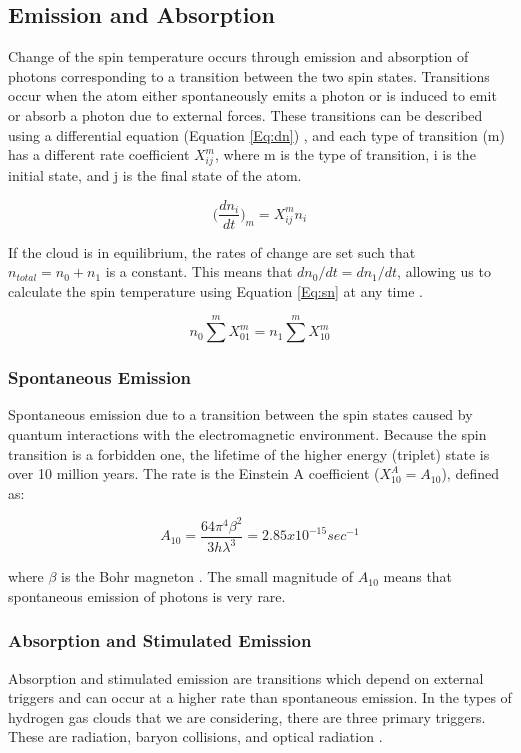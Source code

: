 \subsection{Emission and Absorption} \label{Sec:dT_S}
Change of the spin temperature occurs through emission and absorption of \cm photons corresponding to a transition between the two spin states. Transitions occur when the atom either spontaneously emits a photon or is induced to emit or absorb a photon due to external forces. These transitions can be described using a differential equation (Equation \ref{Eq:dn}) \cite{furlanetto_2006}, and each type of transition (m) has a different rate coefficient $X^m_{ij}$, where m is the type of transition, i is the initial state, and j is the final state of the atom. 

\begin{equation} \label{Eq:dn}
\Big( \frac{d n_i}{dt} \Big)_m = X^m_{ij} n_i
\end{equation}

If the cloud is in equilibrium, the rates of change are set such that $n_{total} = n_0 + n_1$ is a constant. This means that $d n_0/dt = d n_1 /dt$, allowing us to calculate the spin temperature using Equation \ref{Eq:sn} at any time \cite{field_1958}. 

\begin{equation} \label{Eq:sn}
n_0 \sum^m X^m_{01} = n_1 \sum^m X^m_{10}
\end{equation}

\subsubsection{Spontaneous Emission}
Spontaneous emission due to a transition between the spin states caused by quantum interactions with the electromagnetic environment. Because the spin transition is a forbidden one, the lifetime of the higher energy (triplet) state is over 10 million years. The rate is the Einstein A coefficient ($X^A_{10} = A_{10}$), defined as:

\begin{equation}
A_{10} = \frac{64 \pi^4 \beta^2}{3 h \lambda^3} = 2.85 x 10^{-15} sec^{-1}
\end{equation}

where $\beta$ is the Bohr magneton \cite{field_1958}. The small magnitude of $A_{10}$ means that spontaneous emission of \cm photons is very rare. 

\subsubsection{Absorption and Stimulated Emission}
Absorption and stimulated emission are transitions which depend on external triggers and can occur at a higher rate than spontaneous emission. In the types of hydrogen gas clouds that we are considering, there are three primary triggers. These are \cm radiation, baryon collisions, and optical radiation \cite{field_1958}. 

